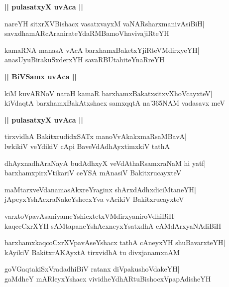 \documentclass[twoside,12pt,openright]{book}
\newcounter{shloka}[chapter]
\def\uvaca#1{\centerline{{\large\textbf{#1}}}}
\begin{document}
\uvaca{|| pulasatxyX uvAca ||}
\begin{shloka}%
nareYH sitxrXVBishacx vasatxvayxM vaNARsharxmanivAsiBiH|\\
savxdhamARcAranirateYdaRMBamoVhavivajiRteYH
\end{shloka}

\begin{shloka}%
kamaRNA manasA vAcA barxhamxBaketxYjiRteVMdirxyeYH|\\
anasUyuBirakuSxderxYH savaRBUtahiteYnaRreYH
\end{shloka}

\uvaca{|| BiVSamx uvAca ||}
\begin{shloka}%
kiM kuvARNoV naraH kamaR barxhamxBakatxsitxvXhoVcayxteV|\\
kiVdaqtA barxhamxBakAtxshacx samxqqtA na\char'365NAM vadasavx meV  
\end{shloka}

\uvaca{|| pulasatxyX uvAca ||}
\begin{shloka}%
tirxvidhA BakitxrudidxSATx manoVvAkakxmaRsaMBavA|\\
lwkikiV veYdikiV cApi BaveVdAdhAyxtimxkiV tathA
\end{shloka}

\begin{shloka}%
dhAyxnadhAraNayA budAdhxyX veVdAthaRsamxraNaM hi yatf|\\
barxhamxpirxVtikariV ceYSA mAnasiV BakitxrucayxteV
\end{shloka}

\begin{shloka}%
maMtarxveVdanamasAkxreYraginx shArxdAdhxdiciMtaneYH|\\
jApeyxYshAcxraNakeYshecxYva vAcikiV BakitxrucayxteV
\end{shloka}

\begin{shloka}%
varxtoVpavAsaniyameYshicxtetxVMdirxyaniroVdhiBiH|\\
kaqceCxrXYH sAMtapaneYshAcxneyxYsatxdhA cAMdArxyaNAdiBiH
\end{shloka}

\begin{shloka}%
barxhamxkaqcoCxrXVpavAseYshacx tathA cAneyxYH shuBavarxteYH|\\
kAyikiV BakitxrAKAyxtA tirxvidhA tu divxjanamxnAM 
\end{shloka}

\begin{shloka}%
goVGaqtakiSxVradadhiBiV ratanx diVpakushoVdakeYH|\\
gaMdheY mARleyxYshacx vividheYdhARtuBishocxVpapAdisheYH
\end{shloka}
\end{document}
